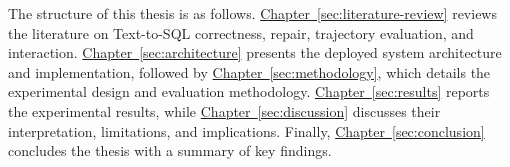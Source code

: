The structure of this thesis is as follows.
\hyperref[sec:literature-review]{Chapter~\ref*{sec:literature-review}}
reviews the literature on Text-to-SQL correctness, repair, trajectory evaluation,
and interaction.
\hyperref[sec:architecture]{Chapter~\ref*{sec:architecture}}
presents the deployed system architecture and implementation, followed by
\hyperref[sec:methodology]{Chapter~\ref*{sec:methodology}},
which details the experimental design and evaluation methodology.
\hyperref[sec:results]{Chapter~\ref*{sec:results}}
reports the experimental results, while
\hyperref[sec:discussion]{Chapter~\ref*{sec:discussion}}
discusses their interpretation, limitations, and implications. Finally,
\hyperref[sec:conclusion]{Chapter~\ref*{sec:conclusion}}
concludes the thesis with a summary of key findings.
